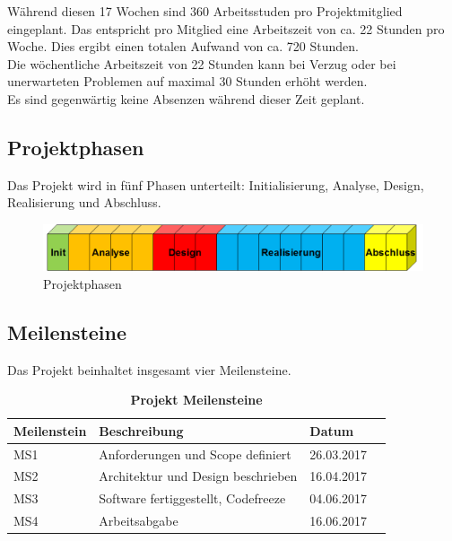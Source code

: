 \noindent Während diesen 17 Wochen sind 360 Arbeitsstuden pro Projektmitglied eingeplant. Das entspricht pro Mitglied eine Arbeitszeit von ca. 22 Stunden pro Woche. Dies ergibt einen totalen Aufwand von ca. 720 Stunden.\\

\noindent Die wöchentliche Arbeitszeit von 22 Stunden kann bei Verzug oder bei unerwarteten Problemen auf maximal 30 Stunden erhöht werden. \\

\noindent Es sind gegenwärtig keine Absenzen während dieser Zeit geplant.

\subsection{Projektphasen}
Das Projekt wird in fünf Phasen unterteilt: Initialisierung, Analyse, Design, Realisierung und Abschluss.
\newline
\begin{figure}[H]
\centering
\includegraphics[width=1\textwidth]{images/phasen.png}
\caption{Projektphasen}
\end{figure}
\subsection{Meilensteine}
Das Projekt beinhaltet insgesamt vier Meilensteine. \\
\begin{table}[H]
    \begin{tabular}{@{} l l l r@{}}\toprule    
    {Meilenstein} & {Beschreibung} & {Datum}\\ \midrule
    MS1 & Anforderungen und Scope definiert  & 26.03.2017\\ \addlinespace
    MS2 & Architektur und Design beschrieben & 16.04.2017\\ \addlinespace
    MS3 & Software fertiggestellt, Codefreeze  & 04.06.2017\\ \addlinespace
    MS4 & Arbeitsabgabe & 16.06.2017\\ 
    \bottomrule
    \end{tabular}
\caption{\textbf{Projekt Meilensteine}}
\end{table}

